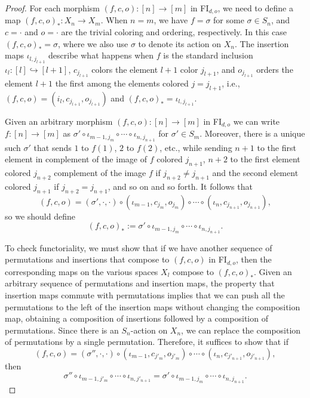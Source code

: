 \documentclass[pagebackref,colorlinks,citecolor=blue,linkcolor=blue,urlcolor=blue,filecolor=blue]{article}
\theoremstyle{definition}\newtheorem{definition}[thm]{Definition}
\theoremstyle{definition}
\begin{document}
\begin{proof}
For each morphism $(f, c, o):[n]\to [m]$ in FI$_{d,o}$, we need to define a map $(f, c, o)_{*}:X_{n}\to X_{m}$.
When $n=m$, we have $f=\sigma$ for some $\sigma\in S_{n}$, and $c=\cdot$ and $o=\cdot$ are the trivial coloring and ordering, respectively.
In this case $(f, c, o)_{*}=\sigma$, where we also use $\sigma$ to denote its action on $X_{n}$.
The insertion maps $\iota_{l,j_{l+1}}$ describe what happens when $f$ is the standard inclusion $\iota_{l}:[l]\hookrightarrow [l+1]$, $c_{j_{l+1}}$ colors the element $l+1$ color $j_{l+1}$, and $o_{j_{l+1}}$ orders the element $l+1$ the first among the elements colored $j=j_{l+1}$, i.e., $(f, c, o)=(i_{l}, c_{j_{l+1}}, o_{j_{l+1}})$ and $(f, c, o)_{*}=\iota_{l, j_{l+1}}$.

Given an arbitrary morphism $(f, c, o):[n]\to[m]$ in FI$_{d,o}$ we can write $f:[n]\to [m]$ as $\sigma'\circ \iota_{m-1, j_{m}}\circ\cdots\circ \iota_{n, j_{n+1}}$ for $\sigma'\in S_{m}$.
Moreover, there is a unique such $\sigma'$ that sends $1$ to $f(1)$, $2$ to $f(2)$, etc., while sending $n+1$ to the first element in complement of the image of $f$ colored $j_{n+1}$, $n+2$ to the first element colored $j_{n+2}$ complement of the image $f$ if $j_{n+2}\neq j_{n+1}$ and the second element colored $j_{n+1}$ if $j_{n+2}=j_{n+1}$, and so on and so forth.
It follows that 
\[
(f, c, o)=(\sigma', \cdot, \cdot)\circ(\iota_{m-1}, c_{j_{m}}, o_{j_{m}})\circ\cdots\circ (\iota_{n}, c_{j_{n+1}}, o_{j_{n+1}}),
\]
so we should define
\[
(f, c, o)_{*}:=\sigma'\circ\iota_{m-1, j_{m}}\circ\cdots\circ\iota_{n, j_{n+1}}.
\]

To check functoriality, we must show that if we have another sequence of permutations and insertions that compose to $(f, c, o)$ in FI$_{d,o}$, then the corresponding maps on the various spaces $X_{l}$ compose to $(f, c, o)_{*}$.
Given an arbitrary sequence of permutations and insertion maps, the property that insertion maps commute with permutations implies that we can push all the permutations to the left of the insertion maps without changing the composition map, obtaining a composition of insertions followed by a composition of permutations.
Since there is an $S_{n}$-action on $X_{n}$, we can replace the composition of permutations by a single permutation.
Therefore, it suffices to show that if
\[
(f, c, o)=(\sigma'', \cdot, \cdot)\circ (\iota_{m-1}, c_{j'_{m}}, o_{j'_{m}})\circ \cdots\circ(\iota_{n}, c_{j'_{n+1}}, o_{j'_{n+1}}),
\]
then
\[
\sigma''\circ\iota_{m-1, j'_{m}}\circ \cdots\circ\iota_{n, j'_{n+1}}=\sigma'\circ\iota_{m-1, j_{m}}\circ \cdots\circ\iota_{n, j_{n+1}}.
\]


\end{proof}
\end{document}
